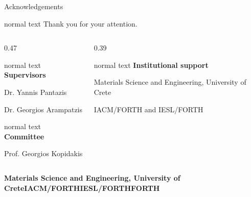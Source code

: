 \documentclass[aspectratio=169,10pt]{beamer}
\begin{document}
\GVSetNoFooter
\begin{frame}{Acknowledgements}
  \vspace{0.02cm}
  \begin{center}
    \begin{beamercolorbox}[wd=0.88\textwidth,sep=0.38em,center]{normal text}
      {\fontsize{22}{26}\selectfont\color{GVTitleRed}Thank you for your attention.}
    \end{beamercolorbox}
  \end{center}
  \vspace{0.12cm}
  \begin{columns}[T,totalwidth=0.88\textwidth]
    \begin{column}{0.47\textwidth}
      \begin{beamercolorbox}[wd=\linewidth,sep=0.50em]{normal text}
        \small
        \textbf{\color{GVTeal}Supervisors}\par
        \vspace{0.10cm}
        Dr. Yannis Pantazis\par
        Dr. Georgios Arampatzis
      \end{beamercolorbox}
      \vspace{0.08cm}
      \begin{beamercolorbox}[wd=\linewidth,sep=0.50em]{normal text}
        \small
        \textbf{\color{GVTeal}Committee}\par
        \vspace{0.10cm}
        Prof. Georgios Kopidakis
      \end{beamercolorbox}
    \end{column}
    \begin{column}{0.39\textwidth}
      \begin{beamercolorbox}[wd=\linewidth,sep=0.50em]{normal text}
        \small
        \textbf{\color{GVTeal}Institutional support}\par
        \vspace{0.10cm}
        Materials Science and Engineering, University of Crete\par
        \vspace{0.12cm}
        IACM/FORTH and IESL/FORTH
      \end{beamercolorbox}
    \end{column}
  \end{columns}
  \vfill
  \begin{center}
    {\scriptsize\color{GVSlate}\textbf{Materials Science and Engineering, University of Crete}\quad\textbar\quad\textbf{IACM/FORTH}\quad\textbar\quad\textbf{IESL/FORTH}\quad\textbar\quad\textbf{FORTH}}\par

\end{center}
\end{frame}
\end{document}
